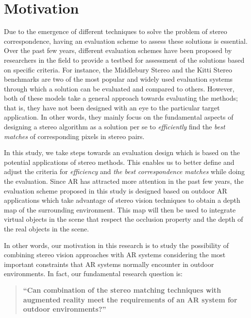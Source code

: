 \section {Motivation}

Due to the emergence of different techniques to solve the problem of stereo correspondence, having an evaluation scheme to assess 
these solutions is essential. Over the past few years, different evaluation schemes have been proposed 
by researchers in the field to provide a testbed for assessment of the solutions based on specific criteria.
For instance, the Middlebury Stereo \cite{mideval} and the Kitti Stereo benchmarks \cite{kitti}
are two of the most popular and widely used evaluation systems through which a solution can be evaluated and compared 
to others. 
However, both of these models take a general approach towards evaluating the methods; that is, they 
have not been designed with an eye to the particular target application. In other words, 
they mainly focus on the fundamental aspects of designing a stereo algorithm as a solution per se to \textit{efficiently}
find the \textit{best matches} of corresponding pixels in stereo pairs. 

In this study, we take steps towards an evaluation design which is based on the potential 
applications of stereo methods.
This enables us to better define and adjust the criteria for \textit{efficiency} and 
\textit{the best correspondence matches} while doing the evaluation.
Since AR has attracted more attention in the past few years, 
the evaluation scheme proposed in this study is designed based on outdoor AR applications which take advantage of
stereo vision techniques to obtain a depth map of the surrounding environment. This map will then be used to
integrate virtual objects in the scene that respect the occlusion property and the depth of the real objects in the scene. 

In other words, our motivation in this research is to study the possibility of combining stereo vision approaches with 
AR systems considering the most important constraints that AR systems
normally encounter in outdoor environments. 
In fact, our fundamental research question is: \newline

\begin{quote}
\textbf{``Can combination of the stereo matching techniques with augmented reality meet the requirements of an AR system for outdoor 
environments?''} \newline
\end{quote}

